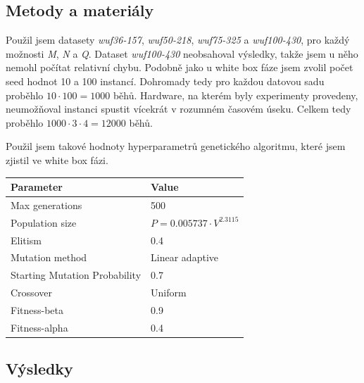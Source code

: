 \documentclass[12pt]{article}
\begin{document}
\subsection{Metody a materiály}
Použil jsem datasety \textit{wuf36-157}, \textit{wuf50-218}, \textit{wuf75-325} a \textit{wuf100-430}, pro každý možnosti \textit{M}, \textit{N} a \textit{Q}. Dataset \textit{wuf100-430} neobsahoval výsledky, takže jsem u něho nemohl počítat relativní chybu. Podobně jako u white box fáze jsem zvolil počet seed hodnot 10 a 100 instancí. Dohromady tedy pro každou datovou sadu proběhlo $10\cdot 100 = 1000$ běhů. Hardware, na kterém byly experimenty provedeny, neumožňoval instanci spustit vícekrát v rozumném časovém úseku. Celkem tedy proběhlo $1000 \cdot 3 \cdot 4 = 12000$ běhů.

Použil jsem takové hodnoty hyperparametrů genetického algoritmu, které jsem zjistil ve white box fázi.
\begin{table}[h!]
\centering
\begin{tabular}{@{}ll@{}}
\toprule
\textbf{Parameter}        & \textbf{Value}       \\ \midrule
Max generations           & 500                \\
Population size           & $P = 0.005737 \cdot V^{2.3115}$             \\
Elitism                   & 0.4 \\
Mutation method           & Linear adaptive \\
Starting Mutation Probability      & 0.7                 \\
Crossover                 & Uniform             \\
Fitness-beta              & 0.9            \\
Fitness-alpha             & 0.4                 \\ \bottomrule
\end{tabular}
\label{tab:ga_parameters}
\end{table}

\subsection{Výsledky}
\end{document}
